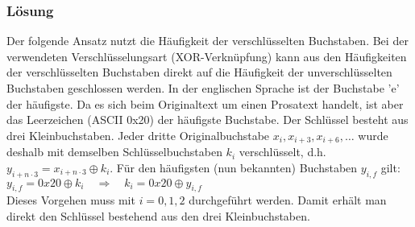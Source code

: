 \subsubsection{Lösung}
Der folgende Ansatz nutzt die Häufigkeit der verschlüsselten Buchstaben. Bei der verwendeten Verschlüsselungsart (XOR-Verknüpfung) kann aus den Häufigkeiten der verschlüsselten Buchstaben direkt auf die Häufigkeit der unverschlüsselten Buchstaben geschlossen werden.
In der englischen Sprache ist der Buchstabe 'e' der häufigste. Da es sich beim Originaltext um einen Prosatext handelt, ist aber das Leerzeichen (ASCII 0x20) der häufigste Buchstabe.
Der Schlüssel besteht aus drei Kleinbuchstaben. Jeder dritte Originalbuchstabe $x_i, x_{i+3}, x_{i+6}, \ldots$ wurde deshalb mit demselben Schlüsselbuchstaben $k_i$ verschlüsselt, d.h. $y_{i+n\cdot3} = x_{i+n\cdot3} \oplus k_i$. Für den häufigsten (nun bekannten) Buchstaben $y_{i,f}$ gilt:\\
$y_{i,f} = 0x20 \oplus k_i \quad \Rightarrow \quad k_i = 0x20 \oplus y_{i,f}$\\
Dieses Vorgehen muss mit $i = 0, 1, 2$ durchgeführt werden. Damit erhält man direkt den Schlüssel bestehend aus den drei Kleinbuchstaben.


